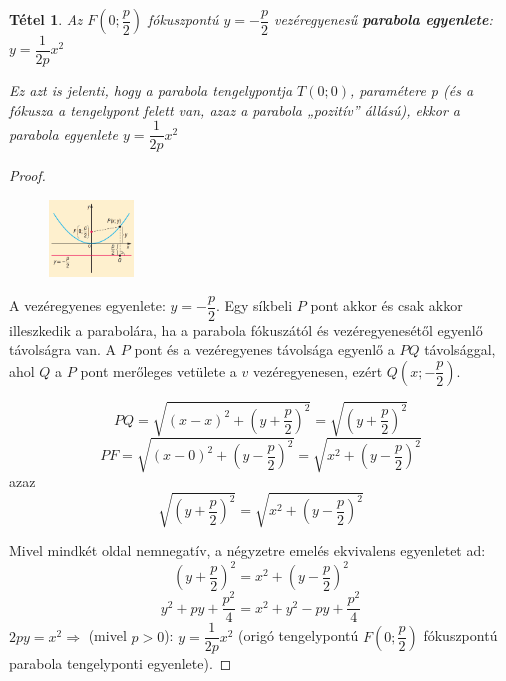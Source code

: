 \documentclass[12pt,a4paper]{article}
\newtheorem{theorem}{Tétel} [section]
\begin{document}
\begin{theorem}
Az $F\left(0; \dfrac{p}{2} \right)$ fókuszpontú $y=-\dfrac{p}{2}$ vezéregyenesű \textbf{parabola egyenlete}: $y=\dfrac{1}{2p}x^2$

Ez azt is jelenti, hogy a parabola tengelypontja $T(0; 0)$, paramétere p (és a fókusza a tengelypont felett van, azaz a parabola „pozitív” állású), ekkor a parabola egyenlete $y=\dfrac{1}{2p}x^2$
\end{theorem}
\begin{proof}
\begin{figure}[h!]
\centering
\includegraphics[width=0.2\textwidth]{parabola_egyenlet_biz}
\end{figure}

A vezéregyenes egyenlete: $y=-\dfrac{p}{2}$. Egy síkbeli $P$ pont akkor és csak akkor illeszkedik a parabolára, ha a parabola fókuszától és vezéregyenesétől egyenlő távolságra van. A $P$ pont és a vezéregyenes távolsága egyenlő a $PQ$ távolsággal, ahol $Q$ a $P$ pont merőleges vetülete a $v$ vezéregyenesen, ezért $Q\left(x; -\dfrac{p}{2} \right)$.

$$PQ=\sqrt{(x-x)^2+\left(y+\dfrac{p}{2} \right)^2}=\sqrt{\left(y+\dfrac{p}{2}\right)^2}$$
$$PF=\sqrt{(x-0)^2+\left(y-\dfrac{p}{2} \right)^2}=\sqrt{x^2+\left(y-\dfrac{p}{2}\right)^2}$$
azaz
$$\sqrt{\left(y+\dfrac{p}{2}\right)^2}=\sqrt{x^2+\left(y-\dfrac{p}{2}\right)^2}$$

Mivel mindkét oldal nemnegatív, a négyzetre emelés ekvivalens egyenletet ad:
$$\left(y+\dfrac{p}{2}\right)^2=x^2+\left(y-\dfrac{p}{2}\right)^2$$
$$y^2+py+\dfrac{p^2}{4}=x^2+y^2-py+\dfrac{p^2}{4}$$
$2py=x^2\Rightarrow$ (mivel $p>0$): $y=\dfrac{1}{2p}x^2$ (origó tengelypontú $F\left(0; \dfrac{p}{2} \right)$ fókuszpontú parabola tengelyponti egyenlete).
\end{proof}
\end{document}
